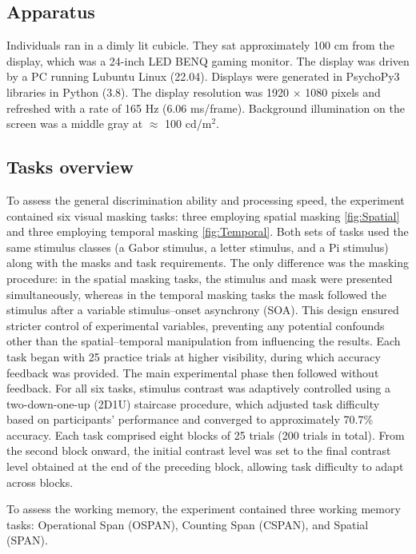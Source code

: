 \documentclass[
  ,man]{apa6}
\begin{document}
\subsection{Apparatus}\label{apparatus}

Individuals ran in a dimly lit cubicle. They sat approximately 100 cm from the display, which was a 24-inch LED BENQ gaming monitor. The display was driven by a PC running Lubuntu Linux (22.04). Displays were generated in PsychoPy3 libraries in Python (3.8). The display resolution was 1920 \(\times\) 1080 pixels and refreshed with a rate of 165 Hz (6.06 ms/frame). Background illumination on the screen was a middle gray at \(\approx\) 100 cd/m\(^2\).

\subsection{Tasks overview}\label{tasks-overview}

To assess the general discrimination ability and processing speed, the experiment contained six visual masking tasks: three employing spatial masking \ref{fig:Spatial} and three employing temporal masking \ref{fig:Temporal}. Both sets of tasks used the same stimulus classes (a Gabor stimulus, a letter stimulus, and a Pi stimulus) along with the masks and task requirements. The only difference was the masking procedure: in the spatial masking tasks, the stimulus and mask were presented simultaneously, whereas in the temporal masking tasks the mask followed the stimulus after a variable stimulus--onset asynchrony (SOA). This design ensured stricter control of experimental variables, preventing any potential confounds other than the spatial--temporal manipulation from influencing the results. Each task began with 25 practice trials at higher visibility, during which accuracy feedback was provided. The main experimental phase then followed without feedback. For all six tasks, stimulus contrast was adaptively controlled using a two-down-one-up (2D1U) staircase procedure, which adjusted task difficulty based on participants' performance and converged to approximately 70.7\% accuracy. Each task comprised eight blocks of 25 trials (200 trials in total). From the second block onward, the initial contrast level was set to the final contrast level obtained at the end of the preceding block, allowing task difficulty to adapt across blocks.

To assess the working memory, the experiment contained three working memory tasks: Operational Span (OSPAN), Counting Span (CSPAN), and Spatial (SPAN).
\end{document}
